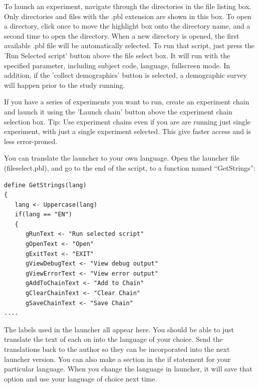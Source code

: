 
To launch an experiment, navigate through the directories in the file listing box.  Only directories and files with the .pbl extension are shown in this box.  To open a directory, click once to move the highlight box onto the directory name, and a second time to open the directory.  When a new directory is opened, the first available .pbl file will be automatically selected.  To run that script, just press the 'Run Selected script' button above the file select box.  It will run with the specified parameter, including subject code, language, fullscreen mode.  In addition, if the 'collect demographics' button is selected, a demographic survey will happen prior to the study running.

If you have a series of experiments you want to run, create an experiment chain and launch it using the 'Launch chain' button above the experiment chain selection box.  Tip: Use experiment chains even if you are are running just single experiment, with just a single experiment selected.  This give faster access and is less error-proned.

You can translate the launcher to your own language.  Open the launcher file (fileselect.pbl), and go to the end of the script, to a function named ``GetStrings'':
\begin{verbatim}
define GetStrings(lang)
{
   lang <- Uppercase(lang)
   if(lang == "EN")
   {
      gRunText <- "Run selected script"
      gOpenText <- "Open"
      gExitText <- "EXIT"
      gViewDebugText <- "View debug output"
      gViewErrorText <- "View error output"
      gAddToChainText <- "Add to Chain"
      gClearChainText <- "Clear Chain"
      gSaveChainText <- "Save Chain"
....
\end{verbatim}

The labels used in the launcher all appear here.  You should be able to just translate the text of each on into the language of your choice.  Send the translations back to the author so they can be incorporated into the next launcher version.  You can also make a section in the if statement for your particular language.  When you change the language in launcher, it will save that option and use your language of choice next time.

